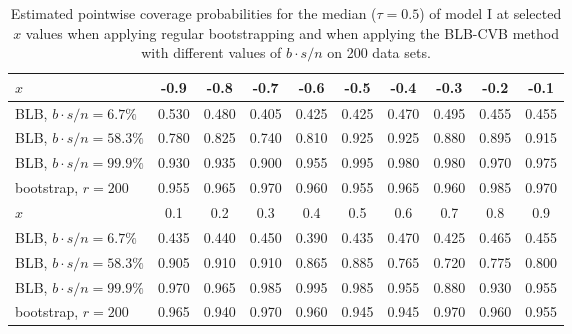 \documentclass{statsoc}
\begin{document}
\begin{table}
\hskip -0.5cm\caption{\label{ratio}Estimated pointwise coverage probabilities for the median ($\tau=0.5$) of model I at selected $x$ values when applying regular bootstrapping and when applying the BLB-CVB method with different values of $b \cdot s/n$ on 200 data sets.
}
\hskip -0.8cm
\begin{tabular}{|l|c|c|c|c|c|c|c|c|c|}
\hline
\cellcolor{Gray} 
$x$            & \cellcolor{Gray} -0.9 &\cellcolor{Gray}  -0.8 & \cellcolor{Gray} -0.7 & \cellcolor{Gray} -0.6 &\cellcolor{Gray}  -0.5 & \cellcolor{Gray} -0.4 &\cellcolor{Gray}  -0.3 &\cellcolor{Gray} -0.2 & \cellcolor{Gray} -0.1 \\ \hline
BLB, $b \cdot s/n=6.7\%$    & 0.530 & 0.480  & 0.405 & 0.425   & 0.425   & 0.470 & 0.495 & 0.455   &0.455\\ \hline
BLB, $b \cdot s/n=58.3\%$   &0.780 & 0.825&   0.740  &   0.810 &   0.925& 0.925 &0.880  &  0.895  &0.915\\ \hline
BLB, $b \cdot s/n=99.9\%$ & 0.930   & 0.935   & 0.900 & 0.955 & 0.995 & 0.980 & 0.980   & 0.970 &0.975\\ \hline
bootstrap, $r=200$ & 0.955   & 0.965   & 0.970 & 0.960 & 0.955 & 0.965 & 0.960   & 0.985 &0.970\\ \hline
\cellcolor{Gray}  
$x$            &\cellcolor{Gray}  0.1 & \cellcolor{Gray} 0.2 &\cellcolor{Gray}  0.3 &\cellcolor{Gray} 0.4 & \cellcolor{Gray} 0.5 & \cellcolor{Gray} 0.6 & \cellcolor{Gray} 0.7 & \cellcolor{Gray} 0.8 & \cellcolor{Gray} 0.9\\ \hline
BLB, $b \cdot s/n=6.7\%$    & 0.435 & 0.440   & 0.450 & 0.390   & 0.435   & 0.470& 0.425 & 0.465  & 0.455\\ \hline
BLB, $b \cdot s/n=58.3\%$  & 0.905 & 0.910 & 0.910  & 0.865 &  0.885  &  0.765  & 0.720 & 0.775 &  0.800  \\ \hline
BLB, $b \cdot s/n=99.9\%$  & 0.970   & 0.965   & 0.985 & 0.995 & 0.985 & 0.955 & 0.880   & 0.930 &0.955\\ \hline
bootstrap, $r=200$ & 0.965   & 0.940   & 0.970 & 0.960 & 0.945 & 0.945 & 0.970   & 0.960 &0.955\\ \hline
\end{tabular}
\end{table}
\end{document}
